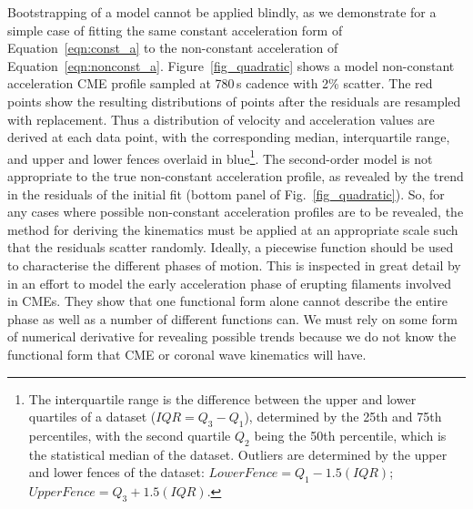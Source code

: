 \documentclass[structabstract]{aa}
\begin{document}
Bootstrapping of a model cannot be applied blindly, as we demonstrate for a simple case of fitting the same constant acceleration form of Equation~\ref{eqn:const_a} to the non-constant acceleration of Equation~\ref{eqn:nonconst_a}. Figure~\ref{fig_quadratic} shows a model non-constant acceleration CME profile sampled at 780\,s cadence with 2\% scatter. The red points show the resulting distributions of points after the residuals are resampled with replacement. Thus a distribution of velocity and acceleration values are derived at each data point, with the corresponding median, interquartile range, and upper and lower fences overlaid in blue\footnote{The interquartile range is the difference between the upper and lower quartiles of a dataset ($IQR=Q_3-Q_1$), determined by the 25th and 75th percentiles, with the second quartile $Q_2$ being the 50th percentile, which is the statistical median of the dataset. Outliers are determined by the upper and lower fences of the dataset: $Lower Fence=Q_1-1.5(IQR)$; $Upper Fence=Q_3+1.5(IQR)$.}. The second-order model is not appropriate to the true non-constant acceleration profile, as revealed by the trend in the residuals of the initial fit (bottom panel of Fig.~\ref{fig_quadratic}). So, for any cases where possible non-constant acceleration profiles are to be revealed, the method for deriving the kinematics must be applied at an appropriate scale such that the residuals scatter randomly. Ideally, a piecewise function should be used to characterise the different phases of motion. This is inspected in great detail by \citet{2008ApJ...674..586S} in an effort to model the early acceleration phase of erupting filaments involved in CMEs. They show that one functional form alone cannot describe the entire phase as well as a number of different functions can. We must rely on some form of numerical derivative for revealing possible trends because we do not know the functional form that CME or coronal wave kinematics will have.
\end{document}
